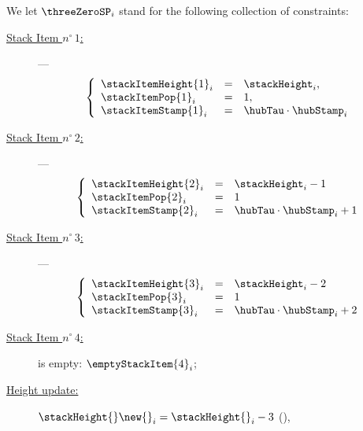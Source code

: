 
We let $\threeZeroSP_{i}$ stand for the following collection of constraints:
\begin{description}
	\item[\underline{Stack Item $n^\circ\,1$:}] ---
	\[
	\left\{
		\begin{array}{lcl}
			\stackItemHeight{1}_{i}	& = & \stackHeight_{i}, \\
			\stackItemPop{1}_{i}	& = & 1, \\
			\stackItemStamp{1}_{i}	& = & \hubTau \cdot \hubStamp_{i}
		\end{array}
	\right.
	\]
	\item[\underline{Stack Item $n^\circ\,2$:}] ---
	\[
	\left\{
		\begin{array}{lcl}
			\stackItemHeight{2}_{i}	& = & \stackHeight_{i} - 1 \\
			\stackItemPop{2}_{i}	& = & 1 \\
			\stackItemStamp{2}_{i}	& = & \hubTau \cdot \hubStamp_{i} + 1
		\end{array}
	\right.
	\]
	\item[\underline{Stack Item $n^\circ\,3$:}] ---
	\[
	\left\{
		\begin{array}{lcl}
			\stackItemHeight{3}_{i}	& = & \stackHeight_{i} - 2 \\
			\stackItemPop{3}_{i}	& = & 1 \\
			\stackItemStamp{3}_{i}	& = & \hubTau \cdot \hubStamp_{i} + 2
		\end{array}
	\right.
	\]
	\item[\underline{Stack Item $n^\circ\,4$:}] is empty: $\emptyStackItem{4} _{i}$;
	\item[\underline{Height update:}] $\stackHeight{}\new{}_{i} = \stackHeight{}_{i} - 3$ \quad (\sanityCheck),
\end{description}





